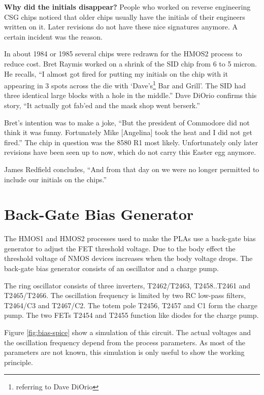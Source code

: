 \begin{mytextframe}{.9\textwidth}

\textbf{Why did the initials disappear?}
People who worked on reverse engineering CSG chips noticed that older chips
usually have the initials of their engineers written on it. Later revisions
do not have these nice signatures anymore.  A certain incident was the reason.

In about 1984 or 1985 several chips were redrawn for the HMOS2 process to
reduce cost. Bret Raymis worked on a shrink of the SID chip from 6 to 5
micron. He recalls, ``I almost got fired for putting my initials on the chip
with it appearing in 3 spots across the die with `Dave's\footnote{referring
to Dave DiOrio} Bar and Grill'. The SID had three identical large blocks
with a hole in the middle.'' Dave DiOrio confirms this story, ``It actually
got fab'ed and the mask shop went berserk.''

Bret's intention was to make a joke, ``But the president of Commodore did
not think it was funny. Fortunately Mike [Angelina] took the heat and I did
not get fired.'' The chip in question was the 8580 R1 most likely.
Unfortunately only later revisions have been seen up to now, which do not
carry this Easter egg anymore.

James Redfield concludes, ``And from that day on we were no longer permitted
to include our initials on the chips.''

\end{mytextframe}

\clearpage
\section{Back-Gate Bias Generator}

The HMOS1 and HMOS2 processes used to make the PLAs use a back-gate bias
generator to adjust the FET threshold voltage. Due to the body effect the
threshold voltage of NMOS devices increases when the body voltage drops.
The back-gate bias generator consists of an oscillator and a charge pump.

The ring oscillator consists of three inverters, T2462/T2463,
T2458..T2461 and T2465/T2466. The oscillation frequency is limited by two RC
low-pass filters, T2464/C3 and T2467/C2. The totem pole T2456, T2457 and C1
form the charge pump. The two FETs T2454 and T2455 function like diodes for
the charge pump.

Figure \ref{fig:bias-spice} show a simulation of this circuit. The actual
voltages and the oscillation frequency depend from the process parameters.
As most of the parameters are not known, this simulation is only useful to
show the working principle.

